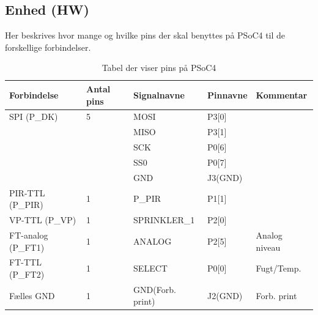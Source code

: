 \begin{table}[H]
\subsection{Enhed (HW)}
Her beskrives hvor mange og hvilke pins der skal benyttes på PSoC4 til de forskellige forbindelser.
\caption{Tabel der viser pins på PSoC4}
\begin{small}
\begin{tabular}{|p{}|p{2cm}|p{}|p{}|p{2.6cm}|}
\hline

\textbf{Forbindelse}	&\textbf{Antal pins} 	&\textbf{Signalnavne} &\textbf{Pinnavne} &\textbf{Kommentar}  \\ \hline

SPI 	(P\_DK)		&5 						&MOSI				&P3[0]		&					\\\cline{3-4}
					&					&MISO				&P3[1]		&					\\\cline{3-4}
					&					&SCK					&P0[6]		&					\\\cline{3-4}
					&					&SS0					&P0[7]		&					\\\cline{3-4}
					&					&GND					&J3(GND) 	&					\\\hline
	
PIR-TTL	(P\_PIR)	&1 						&P\_PIR				&P1[1] 		&					\\\hline

VP-TTL (P\_VP)	&1 						&SPRINKLER\_1		&P2[0]		&					\\\hline

																								
		
FT-analog (P\_FT1)	&1					&ANALOG				&P2[5]		&Analog niveau		\\\hline
FT-TTL (P\_FT2)	&1						&SELECT				&P0[0]		&Fugt/Temp.			\\\hline
																											
					
Fælles GND			&1 					&GND(Forb. print)	&J2(GND) 	&Forb. print			\\\hline					
					


\end{tabular}
\end{small}
\label{table:enhed_forbindelse}
\end{table}

